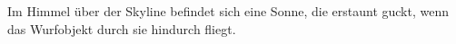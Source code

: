 Im Himmel über der Skyline befindet sich eine Sonne, die erstaunt guckt, wenn das Wurfobjekt durch sie hindurch fliegt.